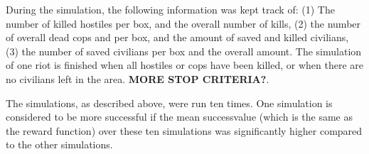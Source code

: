 During the simulation, the following information was kept track of: (1) The number of killed hostiles per box, and the overall number of kills, (2) the number of overall dead cops and per box, and the amount of saved and killed civilians, (3) the number of saved civilians per box and the overall amount. The simulation of one riot is finished when all hostiles or cops have been killed, or when there are no civilians left in the area. \textbf{MORE STOP CRITERIA?}. 
 
The simulations, as described above, were run ten times. One simulation is considered to be more successful if the mean successvalue (which is the same as the reward function) over these ten simulations was significantly higher compared to the other simulations. 